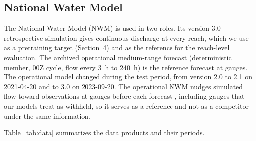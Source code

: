 \subsection{National Water Model}
\label{sec:nwm}
The National Water Model (NWM) is used in two roles. Its version 3.0 retrospective simulation \cite{Cosgrove2024} gives continuous discharge at every reach, which we use as a pretraining target (Section~4) and as the reference for the reach-level evaluation. The archived operational medium-range forecast (deterministic member, 00Z cycle, flow every 3~h to 240~h) is the reference forecast at gauges. The operational model changed during the test period, from version 2.0 to 2.1 on 2021-04-20 and to 3.0 on 2023-09-20. The operational NWM nudges simulated flow toward observations at gauges before each forecast \cite{Cosgrove2024}, including gauges that our models treat as withheld, so it serves as a reference and not as a competitor under the same information.

Table~\ref{tab:data} summarizes the data products and their periods.

